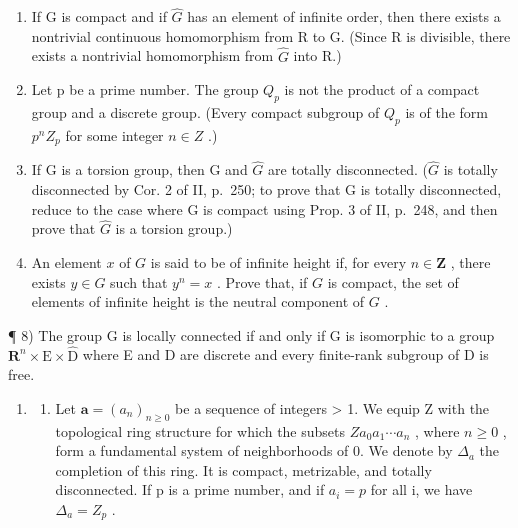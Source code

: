 \begin{enumerate}
\def\labelenumi{\arabic{enumi})}
\setcounter{enumi}{3}
\item
  If G is compact and if \(\widehat{G}\) has an element of infinite order, then there exists a nontrivial continuous homomorphism from R to G. (Since R is divisible, there exists a nontrivial homomorphism from \(\widehat{G}\) into R.)
\item
  Let p be a prime number. The group \(Q_{p}\) is not the product of a compact group and a discrete group. (Every compact subgroup of \(Q_{p}\) is of the form \(p^{n}Z_{p}\) for some integer \(n \in Z\) .)
\item
  If G is a torsion group, then G and \(\widehat{G}\) are totally disconnected. (\(\widehat{G}\) is totally disconnected by Cor. 2 of II, p.~250; to prove that G is totally disconnected, reduce to the case where G is compact using Prop. 3 of II, p.~248, and then prove that \(\widehat{G}\) is a torsion group.)
\item
  An element \(x\) of \(G\) is said to be of infinite height if, for every \(n \in \mathbf{Z}\) , there exists \(y \in G\) such that \(y^n = x\) . Prove that, if \(G\) is compact, the set of elements of infinite height is the neutral component of \(G\) .
\end{enumerate}

¶ 8) The group G is locally connected if and only if G is isomorphic to a group \(\mathbf{R}^{n}\times\mathrm{E}\times\widehat{\mathrm{D}}\) where E and D are discrete and every finite-rank subgroup of D is free.

\begin{enumerate}
\def\labelenumi{\arabic{enumi})}
\setcounter{enumi}{8}
\tightlist
\item
  \begin{enumerate}
  \def\labelenumii{\alph{enumii})}
  \tightlist
  \item
    Let \(\boldsymbol{a}=(a_{n})_{n\geqslant0}\) be a sequence of integers \textgreater{} 1. We equip Z with the topological ring structure for which the subsets \(Za_{0}a_{1}\cdots a_{n}\) , where \(n\geqslant0\) , form a fundamental system of neighborhoods of 0. We denote by \(\Delta_{a}\) the completion of this ring. It is compact, metrizable, and totally disconnected. If p is a prime number, and if \(a_{i}=p\) for all i, we have \(\Delta_{a}=Z_{p}\) .
  \end{enumerate}
\end{enumerate}

